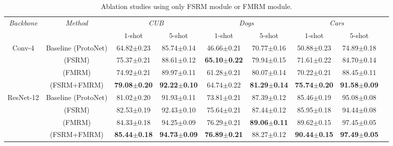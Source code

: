 \documentclass[letterpaper]{article} %
\begin{document}
\begin{table}[!htp]
\centering
\caption{Ablation studies using only FSRM module or FMRM module.}
\label{tab:3}
\begin{tabular}{ccccccccc}
\toprule[1pt]
  \multirow{2}{*}{\it{Backbone}} 
& 
\multirow{2}{*}{\it{Method}} 
& \multicolumn{2}{c}{\it{CUB}}
& \multicolumn{2}{c}{\it{Dogs}} 
& \multicolumn{2}{c}{\it{Cars}} \\ 

&                             
& \multicolumn{1}{c}{$1$-shot}
& \multicolumn{1}{c}{$5$-shot}
& \multicolumn{1}{c}{$1$-shot}
& \multicolumn{1}{c}{$5$-shot} 
& \multicolumn{1}{c}{$1$-shot}
& \multicolumn{1}{c}{$5$-shot} \\ \midrule
                            
\multirow{4}{*}{Conv-4}
& 
Baseline (ProtoNet)       
& 64.82$\pm$0.23       
& 85.74$\pm$0.14          
& 46.66$\pm$0.21       
& 70.77$\pm$0.16 
& 50.88$\pm$0.23
& 74.89$\pm$0.18 \\ 

& 
(FSRM)             
& 75.37$\pm$0.21
& 88.61$\pm$0.12
& \textbf{65.10$\pm$0.22}
& 79.94$\pm$0.15
& 71.61$\pm$0.22
& 84.70$\pm$0.14 \\ 

& 
(FMRM)              
& 74.92$\pm$0.21
& 89.97$\pm$0.11
& 61.28$\pm$0.21
& 80.07$\pm$0.14 
& 70.22$\pm$0.21       
& 88.45$\pm$0.11 \\ 

&
(FSRM+FMRM)
& \textbf{79.08$\pm$0.20}
& \textbf{92.22$\pm$0.10}
& 64.74$\pm$0.22
& \textbf{81.29$\pm$0.14} 
& \textbf{75.74$\pm$0.20}
& \textbf{91.58$\pm$0.09} \\ \midrule
                            
                            
\multirow{4}{*}{ResNet-12}
& 
Baseline (ProtoNet)         
& 81.02$\pm$0.20
& 91.93$\pm$0.11
& 73.81$\pm$0.21
& 87.39$\pm$0.12 
& 85.46$\pm$0.19         
& 95.08$\pm$0.08 \\ 

& 
(FSRM)
& 82.53$\pm$0.19
& 92.43$\pm$0.10
& 75.64$\pm$0.21
& 87.44$\pm$0.12 
& 85.95$\pm$0.18       
& 94.44$\pm$0.08 \\
                            
& 
(FMRM)
& 84.33$\pm$0.18
& 94.25$\pm$0.09
& 76.29$\pm$0.21
& \textbf{89.06$\pm$0.11} 
& 89.62$\pm$0.15       
& 97.45$\pm$0.05 \\

& 
(FSRM+FMRM)
& \textbf{85.44$\pm$0.18}
& \textbf{94.73$\pm$0.09}   
& \textbf{76.89$\pm$0.21}
& 88.27$\pm$0.12 
& \textbf{90.44$\pm$0.15} 
& \textbf{97.49$\pm$0.05}  \\ \bottomrule
\end{tabular}
\end{table}
\end{document}
